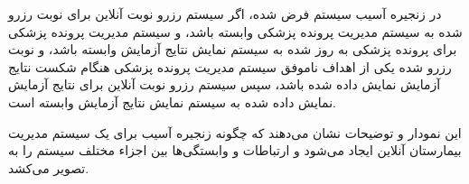 \documentclass[a4paper,10pt]{article}
\begin{document}
\begin{itemize}
\begin{itemize}
        \end{itemize}

    \end{itemize}

    در زنجیره آسیب سیستم فرض شده، اگر سیستم رزرو نوبت آنلاین برای نوبت رزرو شده به سیستم مدیریت پرونده پزشکی وابسته باشد، و سیستم مدیریت پرونده پزشکی برای پرونده پزشکی به روز شده به سیستم نمایش نتایج آزمایش وابسته باشد، و نوبت رزرو شده یکی از اهداف ناموفق سیستم مدیریت پرونده پزشکی هنگام شکست نتایج آزمایش نمایش داده شده باشد، سپس سیستم رزرو نوبت آنلاین برای نتایج آزمایش نمایش داده شده به سیستم نمایش نتایج آزمایش وابسته است.

    این نمودار و توضیحات نشان می‌دهند که چگونه زنجیره آسیب برای یک سیستم مدیریت بیمارستان آنلاین ایجاد می‌شود و ارتباطات و وابستگی‌ها بین اجزاء مختلف سیستم را به تصویر می‌کشد.
\end{document}
